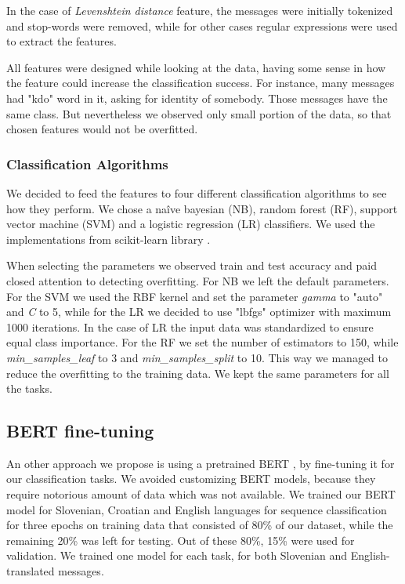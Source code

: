 \documentclass[11pt,a4paper]{article}
\begin{document}
In the case of \textit{Levenshtein distance} feature,  the messages were initially tokenized and stop-words \cite{sloStopWords} were removed, while for other cases regular expressions were used to extract the features.

All features were designed while looking at the data, having some sense in how the feature could increase the classification success. For instance, many messages  had "kdo" word in it, asking for identity of somebody. Those messages have the same class. But nevertheless we observed only small portion of the data, so that chosen features would not be overfitted.

\subsubsection{Classification Algorithms}
\label{sssc:class-alg}
We decided to feed the features to four different classification algorithms to see how they perform. We chose a na\^ive bayesian (NB), random forest (RF), support vector machine (SVM) and a logistic regression (LR) classifiers. We used the implementations from scikit-learn library \cite{scikit-learn}.

When selecting the parameters we observed train and test accuracy and paid closed attention to detecting overfitting. For NB we left the default parameters. For the SVM we used the RBF kernel and set the parameter \textit{gamma} to "auto" and \textit{C} to 5, while for the LR we decided to use "lbfgs" optimizer with maximum 1000 iterations. In the case of LR the input data was standardized to ensure equal class importance. For the RF we set the number of estimators to 150, while \textit{min\_samples\_leaf} to 3 and \textit{min\_samples\_split} to 10. This way we managed to reduce the overfitting to the training data. We kept the same parameters for all the tasks.

\subsection{BERT fine-tuning}
An other approach we propose is using a pretrained BERT \cite{devlin2018bert}, by fine-tuning it for our classification tasks. We avoided customizing BERT models, because they require notorious amount of data which was not available. We trained our BERT model for Slovenian, Croatian and English languages for sequence classification for three epochs on training data that consisted of 80\% of our dataset, while the remaining 20\% was left for testing. Out of these 80\%, 15\% were used for validation. We trained one model for each task, for both Slovenian and English-translated messages.
\end{document}
